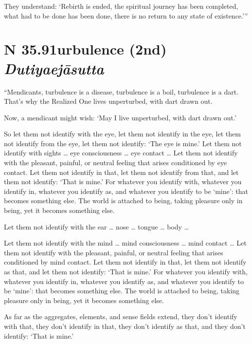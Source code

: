 \documentclass[12pt,openany]{book}%
\newcommand*{\suttatitleacronym}[1]{\smaller[2]{#1}\vspace*{.3em}}
\newcommand*{\suttatitletranslation}[1]{\linebreak{#1}}
\newcommand*{\suttatitleroot}[1]{\linebreak\smaller[2]\itshape{#1}}
\newcommand*{\tocacronym}[1]{\hspace*{-3.3em}{#1}\quad}
\newcommand*{\toctranslation}[1]{#1}
\newcommand*{\tocroot}[1]{(\textit{#1})}
\begin{document}
They understand: ‘Rebirth is ended, the spiritual journey has been completed, what had to be done has been done, there is no return to any state of existence.’” 

%
\section*{{\suttatitleacronym SN 35.91}{\suttatitletranslation Turbulence (2nd) }{\suttatitleroot Dutiyaejāsutta}}
\addcontentsline{toc}{section}{\tocacronym{SN 35.91} \toctranslation{Turbulence (2nd) } \tocroot{Dutiyaejāsutta}}

“Mendicants, turbulence is a disease, turbulence is a boil, turbulence is a dart. That’s why the Realized One lives unperturbed, with dart drawn out. 

Now, a mendicant might wish: ‘May I live unperturbed, with dart drawn out.’ 

So let them not identify with the eye, let them not identify in the eye, let them not identify from the eye, let them not identify: ‘The eye is mine.’ Let them not identify with sights … eye consciousness … eye contact … Let them not identify with the pleasant, painful, or neutral feeling that arises conditioned by eye contact. Let them not identify in that, let them not identify from that, and let them not identify: ‘That is mine.’ For whatever you identify with, whatever you identify in, whatever you identify as, and whatever you identify to be ‘mine’: that becomes something else. The world is attached to being, taking pleasure only in being, yet it becomes something else. 

Let them not identify with the ear … nose … tongue … body … 

Let them not identify with the mind … mind consciousness … mind contact … Let them not identify with the pleasant, painful, or neutral feeling that arises conditioned by mind contact. Let them not identify in that, let them not identify as that, and let them not identify: ‘That is mine.’ For whatever you identify with, whatever you identify in, whatever you identify as, and whatever you identify to be ‘mine’: that becomes something else. The world is attached to being, taking pleasure only in being, yet it becomes something else. 

As far as the aggregates, elements, and sense fields extend, they don’t identify with that, they don’t identify in that, they don’t identify as that, and they don’t identify: ‘That is mine.’ 
\end{document}
